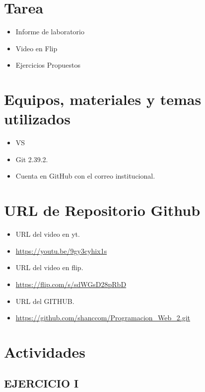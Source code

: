 \documentclass{article}
\begin{document}
	\section{Tarea}
	\begin{itemize}		
		\item Informe de laboratorio
            \item Video en Flip
		\item Ejercicios Propuestos
        
	\end{itemize}
		
	\section{Equipos, materiales y temas utilizados}
	\begin{itemize}
		\item VS
		\item Git 2.39.2.
		\item Cuenta en GitHub con el correo institucional.
	\end{itemize}
    \clearpage
    
	\section{URL de Repositorio Github}
	\begin{itemize}
        \item URL del video en yt.
		\item \url{https://youtu.be/9gy3cyhix1s}
        \item URL del video en flip.
		\item \url{https://flip.com/s/sdWGsD28pRbD}
        \item URL del GITHUB.
            \item \url{https://github.com/shanccom/Programacion_Web_2.git}
	\end{itemize}
	
	\section{Actividades}
	\subsection{EJERCICIO I}
\end{document}
